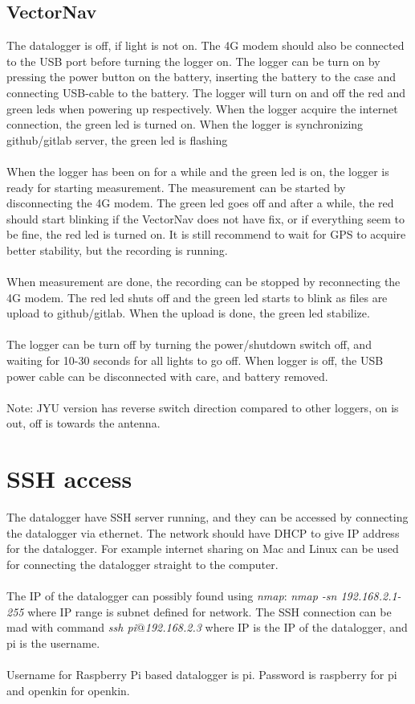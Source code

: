 \documentclass{report}
\begin{document}
\subsection{VectorNav}
The datalogger is off, if light is not on. The 4G modem should also be connected to the USB port before turning the logger on. The logger can be turn on by pressing the power button on the battery, inserting the battery to the case and connecting USB-cable to the battery. The logger will turn on and off the red and green leds when powering up respectively. When the logger acquire the internet connection, the green led is turned on. When the logger is synchronizing github/gitlab server, the green led is flashing\\
\\
When the logger has been on for a while and the green led is on, the logger is ready for starting measurement. The measurement can be started by disconnecting the 4G modem. 
The green led goes off and after a while, the red should start blinking if the VectorNav does not have fix, or if everything seem to be fine, the red led is turned on. It is still recommend to wait for GPS to acquire better stability, but the recording is running.\\
\\
When measurement are done, the recording can be stopped by reconnecting the 4G modem. The red led shuts off and the green led starts to blink as files are upload to github/gitlab. When the upload is done, the green led stabilize.\\
\\
The logger can be turn off by turning the power/shutdown switch off, and waiting for 10-30 seconds for all lights to go off. When logger is off, the USB power cable can be disconnected with care, and battery removed.\\
\\
Note: JYU version has reverse switch direction compared to other loggers, on is out, off is towards the antenna.

\section{SSH access}
The datalogger have SSH server running, and they can be accessed by connecting the datalogger via ethernet. The network should have DHCP to give IP address for the datalogger. For example internet sharing on Mac and Linux can be used for connecting the datalogger straight to the computer.\\
\\
The IP of the datalogger can possibly found using \textit{nmap}: \textit{nmap -sn 192.168.2.1-255} where IP range is subnet defined for network. The SSH connection can be mad with command \textit{ssh pi$@$192.168.2.3} where IP is the IP of the datalogger, and pi is the username.\\
\\
Username for Raspberry Pi based datalogger is pi. Password is raspberry for pi and openkin for openkin.\\
\\
\end{document}
